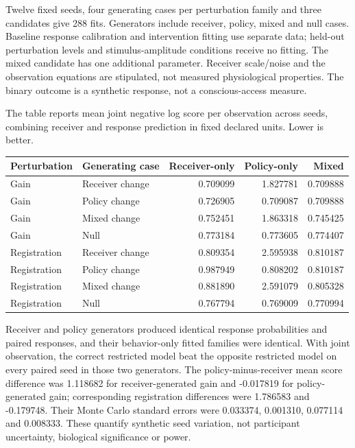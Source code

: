 \documentclass[
  american,
  11pt,
  letterpaper,
]{article}
\newcounter{none} %
\begin{document}
Twelve fixed seeds, four generating cases per perturbation family and three candidates give 288 fits. Generators include receiver, policy, mixed and null cases. Baseline response calibration and intervention fitting use separate data; held-out perturbation levels and stimulus-amplitude conditions receive no fitting. The mixed candidate has one additional parameter. Receiver scale/noise and the observation equations are stipulated, not measured physiological properties. The binary outcome is a synthetic response, not a conscious-access measure.

The table reports mean joint negative log score per observation across seeds, combining receiver and response prediction in fixed declared units. Lower is better.

{\def\LTcaptype{none} %
\begin{longtable}[]{@{}llrrr@{}}
\toprule\noalign{}
Perturbation & Generating case & Receiver-only & Policy-only & Mixed \\
\midrule\noalign{}
\endhead
\bottomrule\noalign{}
\endlastfoot
Gain & Receiver change & 0.709099 & 1.827781 & 0.709888 \\
Gain & Policy change & 0.726905 & 0.709087 & 0.709888 \\
Gain & Mixed change & 0.752451 & 1.863318 & 0.745425 \\
Gain & Null & 0.773184 & 0.773605 & 0.774407 \\
Registration & Receiver change & 0.809354 & 2.595938 & 0.810187 \\
Registration & Policy change & 0.987949 & 0.808202 & 0.810187 \\
Registration & Mixed change & 0.881890 & 2.591079 & 0.805328 \\
Registration & Null & 0.767794 & 0.769009 & 0.770994 \\
\end{longtable}
}

Receiver and policy generators produced identical response probabilities and paired responses, and their behavior-only fitted families were identical. With joint observation, the correct restricted model beat the opposite restricted model on every paired seed in those two generators. The policy-minus-receiver mean score difference was 1.118682 for receiver-generated gain and -0.017819 for policy-generated gain; corresponding registration differences were 1.786583 and -0.179748. Their Monte Carlo standard errors were 0.033374, 0.001310, 0.077114 and 0.008333. These quantify synthetic seed variation, not participant uncertainty, biological significance or power.
\end{document}
